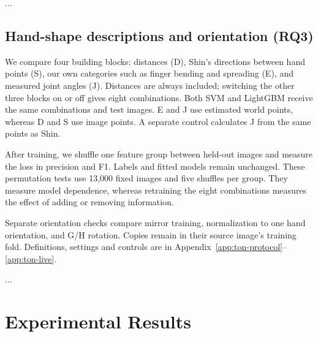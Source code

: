 \documentclass{article}
\begin{document}




\par\noindent ...\par\medskip
\subsection{Hand-shape descriptions and orientation (RQ3)}\label{sec:ton-methods}
We compare four building blocks: distances (D), Shin's directions between hand points (S), our own categories such as finger bending and spreading (E), and measured joint angles (J). Distances are always included; switching the other three blocks on or off gives eight combinations. Both SVM and LightGBM receive the same combinations and test images. E and J use estimated world points, whereas D and S use image points. A separate control calculates J from the same points as Shin.

After training, we shuffle one feature group between held-out images and measure the loss in precision and F1. Labels and fitted models remain unchanged. These permutation tests use 13,000 fixed images and five shuffles per group. They measure model dependence, whereas retraining the eight combinations measures the effect of adding or removing information.

Separate orientation checks compare mirror training, normalization to one hand orientation, and G/H rotation. Copies remain in their source image's training fold. Definitions, settings and controls are in Appendix~\ref{app:ton-protocol}--\ref{app:ton-live}.
\par\noindent ...\par\medskip


\section{Experimental Results}
\end{document}
